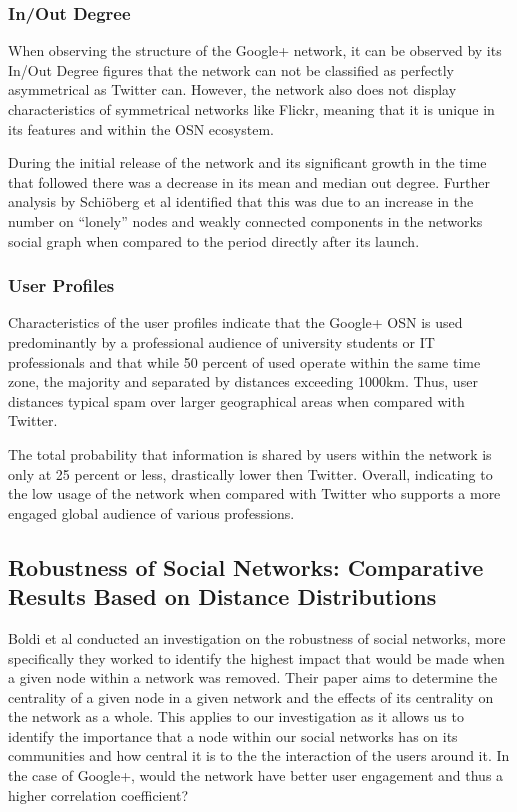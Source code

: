 \documentclass[a4paper, 10pt, conference]{ieeeconf}      %
\begin{document}
\subsubsection{In/Out Degree}
When observing the structure of the Google+ network, it can be observed by its In/Out Degree figures that the network can not be classified as perfectly asymmetrical as Twitter can. However, the network also does not display characteristics of symmetrical networks like Flickr, meaning that it is unique in its features and within the OSN ecosystem.

During the initial release of the network and its significant growth in the time that followed there was a decrease in its mean and median out degree. Further analysis by Schi\"oberg et al \cite{c13} identified that this was due to an increase in the number on “lonely” nodes and weakly connected components in the networks social graph when compared to the period directly after its launch.
\linebreak
\subsubsection{User Profiles}

Characteristics of the user profiles indicate that the Google+ OSN is used predominantly by a professional audience of university students or IT professionals and that while 50 percent of used operate within the same time zone, the majority and separated by distances exceeding 1000km. Thus, user distances typical spam over larger geographical areas when compared with Twitter. 

The total probability that information is shared by users within the network is only at 25 percent or less, drastically lower then Twitter. Overall, indicating to the low usage of the network when compared with Twitter who supports a more engaged global audience of various professions.

\subsection{Robustness of Social Networks: Comparative Results Based on Distance Distributions \cite{c15}}

Boldi et al \cite{c15} conducted an investigation on the robustness of social networks, more specifically they worked to identify the highest impact that would be made when a given node within a network was removed. Their paper aims to determine the centrality of a given node in a given network and the effects of its centrality on the network as a whole. This applies to our investigation as it allows us to identify the importance that a node within our social networks has on its communities and how central it is to the the interaction of the users around it. In the case of Google+, would the network have better user engagement and thus a higher correlation coefficient?
\end{document}
